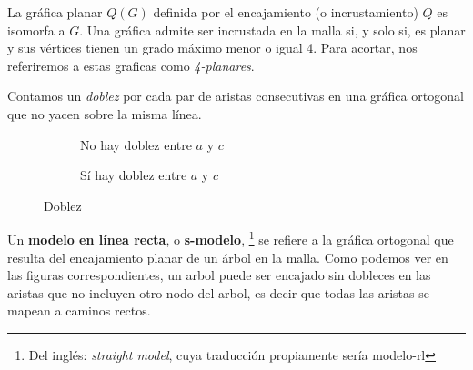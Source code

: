 La gr\'afica planar $Q(G)$ definida por el encajamiento (o incrustamiento) $Q$ es isomorfa a $G$. Una gr\'afica admite ser incrustada en la malla si, y solo si, es planar y sus v\'ertices tienen un grado m\'aximo menor o igual 4. Para acortar, nos referiremos a estas graficas como \emph{4-planares}.

\begin{definition}[Doblez]
Contamos un \emph{doblez}\cite{minbends} por cada par de aristas consecutivas en una gr\'afica ortogonal que no yacen sobre la misma l\'inea.
\end{definition}

\begin{figure}
  \begin{subfigure}{0.4\textwidth}
    \caption{No hay doblez entre $a$ y $c$}
  \end{subfigure}
  \begin{subfigure}{0.4\textwidth}
    \caption{S\'i hay doblez entre $a$ y $c$}
  \end{subfigure}
  \caption{Doblez}
\end{figure}

\begin{definition}
Un \textbf{modelo en l\'inea recta}\cite{minbends}, o \textbf{s-modelo}, \footnote{Del ingl\'es: \textit{straight model}, cuya traducci\'on propiamente ser\'ia modelo-rl} se refiere a la gr\'afica ortogonal que resulta del encajamiento planar de un \'arbol en la malla. Como podemos ver en las figuras correspondientes, un arbol puede ser encajado sin dobleces en las aristas que no incluyen otro nodo del arbol, es decir que todas las aristas se mapean a caminos rectos.
\end{definition}


